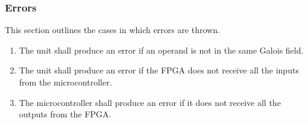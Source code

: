 \documentclass[12pt]{extarticle}
\begin{document}
            \subsubsection{Errors} This section outlines the cases in which
            errors are thrown.
            \begin{enumerate}

                \item The unit shall produce an error if an operand is not in
                the same Galois field.

                \item The unit shall produce an error if the FPGA does not
                receive all the inputs from the microcontroller.

                \item The microcontroller shall produce an error if it does not
                receive all the outputs from the FPGA.

            \end{enumerate}
\end{document}
